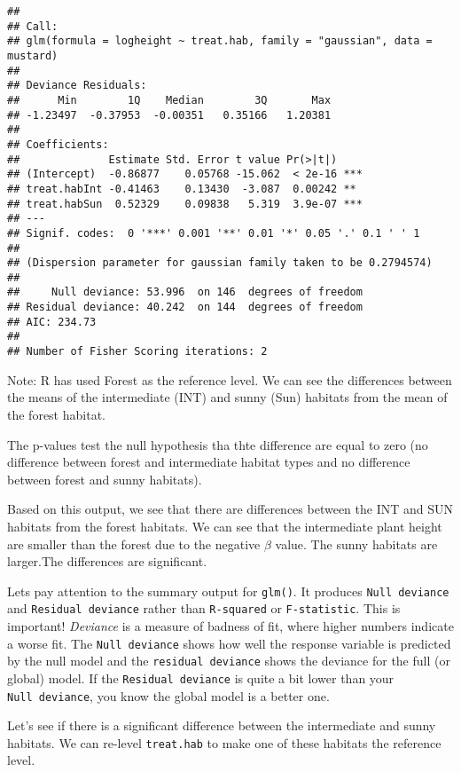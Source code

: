 \documentclass[
]{article}
\begin{document}
\begin{verbatim}
## 
## Call:
## glm(formula = logheight ~ treat.hab, family = "gaussian", data = mustard)
## 
## Deviance Residuals: 
##      Min        1Q    Median        3Q       Max  
## -1.23497  -0.37953  -0.00351   0.35166   1.20381  
## 
## Coefficients:
##              Estimate Std. Error t value Pr(>|t|)    
## (Intercept)  -0.86877    0.05768 -15.062  < 2e-16 ***
## treat.habInt -0.41463    0.13430  -3.087  0.00242 ** 
## treat.habSun  0.52329    0.09838   5.319  3.9e-07 ***
## ---
## Signif. codes:  0 '***' 0.001 '**' 0.01 '*' 0.05 '.' 0.1 ' ' 1
## 
## (Dispersion parameter for gaussian family taken to be 0.2794574)
## 
##     Null deviance: 53.996  on 146  degrees of freedom
## Residual deviance: 40.242  on 144  degrees of freedom
## AIC: 234.73
## 
## Number of Fisher Scoring iterations: 2
\end{verbatim}

Note: R has used Forest as the reference level. We can see the
differences between the means of the intermediate (INT) and sunny (Sun)
habitats from the mean of the forest habitat.

The p-values test the null hypothesis tha thte difference are equal to
zero (no difference between forest and intermediate habitat types and no
difference between forest and sunny habitats).

Based on this output, we see that there are differences between the INT
and SUN habitats from the forest habitats. We can see that the
intermediate plant height are smaller than the forest due to the
negative \(\beta\) value. The sunny habitats are larger.The differences
are significant.

Lets pay attention to the summary output for \texttt{glm()}. It produces
\texttt{Null\ deviance} and \texttt{Residual\ deviance} rather than
\texttt{R-squared} or \texttt{F-statistic}. This is important!
\emph{Deviance} is a measure of badness of fit, where higher numbers
indicate a worse fit. The \texttt{Null\ deviance} shows how well the
response variable is predicted by the null model and the
\texttt{residual\ deviance} shows the deviance for the full (or global)
model. If the \texttt{Residual\ deviance} is quite a bit lower than your
\texttt{Null\ deviance}, you know the global model is a better one.

Let's see if there is a significant difference between the intermediate
and sunny habitats. We can re-level \texttt{treat.hab} to make one of
these habitats the reference level.
\end{document}
